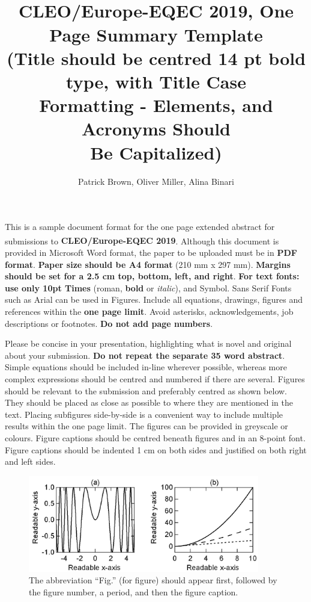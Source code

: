 \documentclass{epsconf}
\title{CLEO\textsuperscript{\textregistered}/Europe-EQEC 2019, One Page
  Summary Template\\
  (Title should be centred 14 pt bold type, with Title Case\\
  Formatting - Elements, and Acronyms Should\\
  Be Capitalized)}
\author{Patrick Brown\authormark{1}, Oliver Miller\authormark{1},
  Alina Binari\authormark{2}}
\affil[1]{University of Paris Sud, 15 rue Cl\'emenceau, F-91400 Orsay, France}
\affil[2]{Universit\`a Politecnica delle Marche, IT-60131 Ancona, Italy}
\begin{document}
\maketitle

This is a sample document format for the one page extended abstract for submissions to \textbf{CLEO\textsuperscript{\textregistered}/Europe-EQEC 2019}. Although this document is provided in Microsoft Word format, the paper to be uploaded must be in \textbf{PDF format}. \textbf{Paper size should be A4 format} (210 mm x 297 mm). \textbf{Margins should be set for a 2.5 cm top, bottom, left, and right}. \textbf{For text fonts: use only 10pt Times} (roman, \textbf{bold} or \textit{italic}), and Symbol. Sans Serif Fonts such as Arial can be used in Figures. Include all equations, drawings, figures and references within the \textbf{one page limit}. Avoid asterisks, acknowledgements, job descriptions or footnotes. \textbf{Do not add page numbers}.

Please be concise in your presentation, highlighting what is novel and original about your submission. \textbf{Do not repeat the separate 35 word abstract}. Simple equations should be included in-line wherever possible, whereas more complex expressions should be centred and numbered if there are several. Figures should be relevant to the submission and preferably centred as shown below. They should be placed as close as possible to where they are mentioned in the text. Placing subfigures side-by-side is a convenient way to include multiple results within the one page limit. The figures can be provided in greyscale or colours. Figure captions should be centred beneath figures and in an 8-point font. Figure captions should be indented 1 cm on both sides and justified on both right and left sides.

\begin{figure}[h!]
  \centering
  \includegraphics[width=0.9\textwidth]{sample.pdf}
  \caption{The abbreviation ``Fig.'' (for figure) should appear first,
    followed by the figure number, a	period,	and then the figure caption.}
\end{figure}
\end{document}
